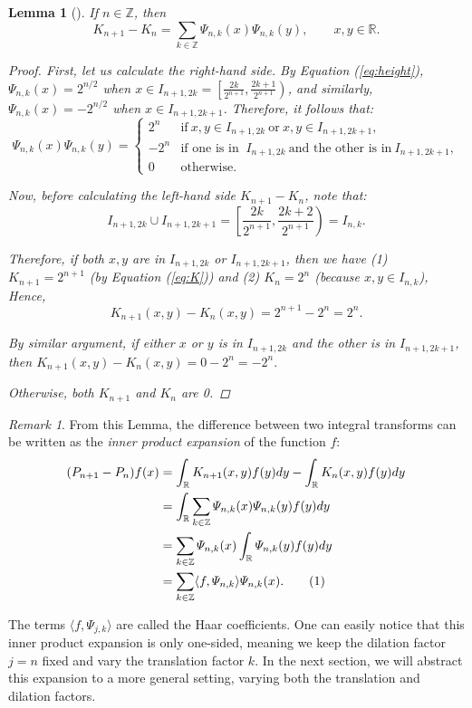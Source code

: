 \documentclass[11pt]{amsart}
\theoremstyle{theorem} %
\newtheorem{lem}[thm]{Lemma} %
\theoremstyle{definition}
\theoremstyle{example}
\theoremstyle{remark}
\newtheorem{rem}[thm]{Remark}
\numberwithin{equation}{section}
\newcommand{\R}{\mathbb{R}}
\newcommand{\Z}{\mathbb{Z}}
\newcommand\numberthis{\addtocounter{equation}{1}\tag{\theequation}}
\begin{document}
\begin{lem}[{\cite[293]{pinsky}}] \label{lem:expansion}
	If $ n \in \Z $, then
	\[ K_{n+1} - K_n = \sum_{k \in \Z} \varPsi_{n,k}(x) \varPsi_{n,k}(y),\qquad x,y \in \R. \]
	
	\begin{proof}
		First, let us calculate the right-hand side.
		By Equation (\ref{eq:height}), $ \varPsi_{n,k}(x) = 2^{n/2} $ when $ x \in I_{n+1,2k} = \left[\frac{2k}{2^{n+1}}, \frac{2k+1}{2^{n+1}}\right) $, and similarly, $\varPsi_{n,k}(x)= -2^{n/2} $ when $ x \in I_{n+1,2k+1}$. Therefore, it follows that:
		\[
		\varPsi_{n,k}(x) \varPsi_{n,k} (y) =
		\begin{cases}
		2^n &\text{if}\ x,y \in I_{n+1,2k}\ \text{or}\ x,y \in I_{n+1,2k+1}, \\
		-2^n &\text{if one is in }\ I_{n+1,2k}\ \text{and the other is in}\ I_{n+1,2k+1}, \\
		0 &\text{otherwise}.
		\end{cases}
		\]
		
		Now, before calculating the left-hand side $ K_{n+1} - K_n $, note that:
		\[
		I_{n+1,2k} \cup I_{n+1,2k+1} = \left[ \frac{2k}{2^{n+1}}, \frac{2k+2}{2^{n+1}} \right) = I_{n,k}. 
		\]
		
		Therefore, if both $ x,y $ are in $ I_{n+1,2k} $ or $ I_{n+1,2k+1} $, then we have (1) $ K_{n+1} = 2^{n+1} $ (by Equation (\ref{eq:K})) and (2) $ K_n = 2^n $ (because $ x,y \in I_{n,k} $), Hence,
		\[ K_{n+1}(x,y) - K_n(x,y) = 2^{n+1} - 2^n = 2^n. \]

		By similar argument, if either $ x $ or $ y $ is in $  I_{n+1,2k} $ and the other is in $ I_{n+1,2k+1} $, then
		$ K_{n+1}(x,y) - K_n(x,y) = 0 - 2^n = -2^n. $ 
		
		Otherwise, both $ K_{n+1} $ and $ K_n $ are 0.
	\end{proof}
\end{lem}

\begin{rem}
	From this Lemma, the difference between two integral transforms can be written as the \textit{inner product expansion} of the function $ f $:
	\begin{align*}
	(P_{n+1} - P_n) f(x) &= \int_{\R} K_{n+1}(x,y)f(y)dy - \int_{\R} K_{n}(x,y)f(y)dy \\
	&= \int_{\R} \sum_{k \in \Z} \varPsi_{n,k}(x) \varPsi_{n,k}(y) f(y) dy \\
	&= \sum_{k \in \Z} \varPsi_{n,k}(x) \int_{\R} \varPsi_{n,k}(y) f(y) dy \\
	&= \sum_{k \in \Z} \langle f, \varPsi_{n,k} \rangle \varPsi_{n,k}(x).  \numberthis \label{eq:expansion}
	\end{align*}
	
	The terms $ \langle f, \varPsi_{j,k} \rangle $ are called the Haar coefficients.
	One can easily notice that this inner product expansion is only one-sided, meaning we keep the dilation factor $ j = n $ fixed and vary the translation factor $ k $. In the next section, we will abstract this expansion to a more general setting, varying both the translation and dilation factors.
\end{rem}
\end{document}
